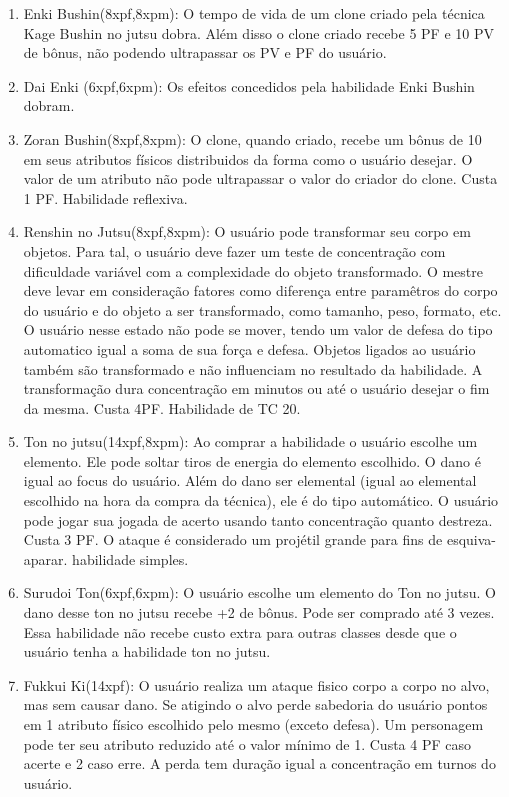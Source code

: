\begin{enumerate}
	\item Enki Bushin(8xpf,8xpm): O tempo de vida de um clone criado pela técnica Kage Bushin no jutsu dobra. Além disso o clone criado recebe 5 PF e 10 PV de bônus, não podendo ultrapassar os PV e PF do usuário.
	
	\item Dai Enki (6xpf,6xpm): Os efeitos concedidos pela habilidade Enki Bushin dobram.
	
	\item Zoran Bushin(8xpf,8xpm): O clone, quando criado, recebe um bônus de 10 em seus atributos físicos distribuidos da forma como o usuário desejar. O valor de um atributo não pode ultrapassar o valor do criador do clone. Custa 1 PF. Habilidade reflexiva.
	
	\item Renshin no Jutsu(8xpf,8xpm): O usuário pode transformar seu corpo em objetos. Para tal, o usuário deve fazer um teste de concentração com dificuldade variável com a complexidade do objeto transformado. O mestre deve levar em consideração fatores como diferença entre paramêtros do corpo do usuário e do objeto a ser transformado, como tamanho, peso, formato, etc. O usuário nesse estado não pode se mover, tendo um valor de defesa do tipo automatico igual a soma de sua força e defesa. Objetos ligados ao usuário também são transformado e não influenciam no resultado da habilidade. A transformação dura concentração em minutos ou até o usuário desejar o fim da mesma. Custa 4PF. Habilidade de TC 20.
	
	\item Ton no jutsu(14xpf,8xpm): Ao comprar a habilidade o usuário escolhe um elemento. Ele pode soltar tiros de energia do elemento escolhido. O dano é igual ao focus do usuário. Além do dano ser elemental (igual ao elemental escolhido na hora da compra da técnica), ele é do tipo automático. O usuário pode jogar sua jogada de acerto usando tanto concentração quanto destreza. Custa 3 PF. O ataque é considerado um projétil grande para fins de esquiva-aparar. habilidade simples.

	\item Surudoi Ton(6xpf,6xpm): O usuário escolhe um elemento do Ton no jutsu. O dano desse ton no jutsu recebe +2 de bônus. Pode ser comprado até 3 vezes. Essa habilidade não recebe custo extra para outras classes desde que o usuário tenha a habilidade ton no jutsu.

	\item Fukkui Ki(14xpf): O usuário realiza um ataque fisico corpo a corpo no alvo, mas sem causar dano. Se atigindo o alvo perde sabedoria do usuário pontos em 1 atributo físico escolhido pelo mesmo (exceto defesa). Um personagem pode ter seu atributo reduzido até o valor mínimo de 1. Custa 4 PF caso acerte e 2 caso erre. A perda tem duração igual a concentração em turnos do usuário. 


\end{enumerate}
